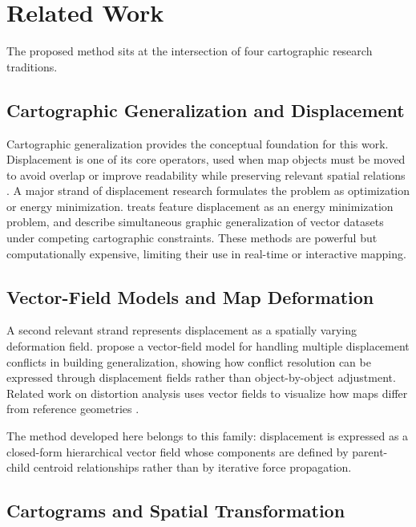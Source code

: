 \documentclass[12pt, a4paper]{article}
\numberwithin{equation}{section}
\begin{document}
\section{Related Work}

The proposed method sits at the intersection of four cartographic research traditions.

\subsection{Cartographic Generalization and Displacement}

Cartographic generalization provides the conceptual foundation for this work. Displacement is one of its core operators, used when map objects must be moved to avoid overlap or improve readability while preserving relevant spatial relations \citep{wu2021, mackaness2011}. A major strand of displacement research formulates the problem as optimization or energy minimization. \citet{bader2001} treats feature displacement as an energy minimization problem, and \citet{harrie2002} describe simultaneous graphic generalization of vector datasets under competing cartographic constraints. These methods are powerful but computationally expensive, limiting their use in real-time or interactive mapping.

\subsection{Vector-Field Models and Map Deformation}

A second relevant strand represents displacement as a spatially varying deformation field. \citet{ai2015} propose a vector-field model for handling multiple displacement conflicts in building generalization, showing how conflict resolution can be expressed through displacement fields rather than object-by-object adjustment. Related work on distortion analysis uses vector fields to visualize how maps differ from reference geometries \citep{jenny2011}.

The method developed here belongs to this family: displacement is expressed as a closed-form hierarchical vector field whose components are defined by parent-child centroid relationships rather than by iterative force propagation.

\subsection{Cartograms and Spatial Transformation}
\end{document}

